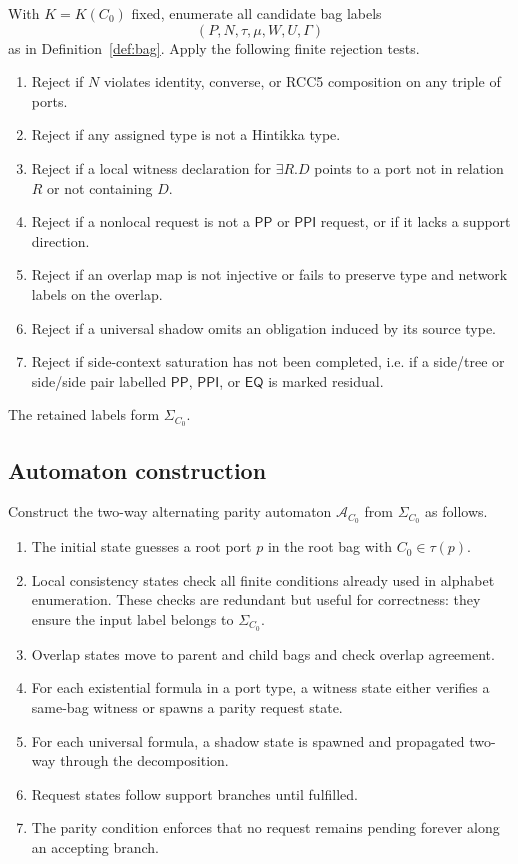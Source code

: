 \documentclass[11pt]{article}
\newcommand{\EQ}{\mathsf{EQ}}
\newcommand{\PP}{\mathsf{PP}}
\newcommand{\PPI}{\mathsf{PPI}}
\newcommand{\APTA}{\mathcal A}
\begin{document}
With $K=K(C_0)$ fixed, enumerate all candidate bag labels
\[
(P,N,\tau,\mu,W,U,\Gamma)
\]
as in Definition~\ref{def:bag}.  Apply the following finite rejection tests.
\begin{enumerate}[label=(A\arabic*)]
\item Reject if $N$ violates identity, converse, or RCC5 composition on any triple of ports.
\item Reject if any assigned type is not a Hintikka type.
\item Reject if a local witness declaration for $\exists R.D$ points to a port not in relation $R$ or not containing $D$.
\item Reject if a nonlocal request is not a $\PP$ or $\PPI$ request, or if it lacks a support direction.
\item Reject if an overlap map is not injective or fails to preserve type and network labels on the overlap.
\item Reject if a universal shadow omits an obligation induced by its source type.
\item Reject if side-context saturation has not been completed, i.e. if a side/tree or side/side pair labelled $\PP$, $\PPI$, or $\EQ$ is marked residual.
\end{enumerate}
The retained labels form $\Sigma_{C_0}$.

\subsection{Automaton construction}

Construct the two-way alternating parity automaton $\APTA_{C_0}$ from $\Sigma_{C_0}$ as follows.

\begin{enumerate}[label=(D\arabic*)]
\item The initial state guesses a root port $p$ in the root bag with $C_0\in\tau(p)$.
\item Local consistency states check all finite conditions already used in alphabet enumeration.  These checks are redundant but useful for correctness: they ensure the input label belongs to $\Sigma_{C_0}$.
\item Overlap states move to parent and child bags and check overlap agreement.
\item For each existential formula in a port type, a witness state either verifies a same-bag witness or spawns a parity request state.
\item For each universal formula, a shadow state is spawned and propagated two-way through the decomposition.
\item Request states follow support branches until fulfilled.
\item The parity condition enforces that no request remains pending forever along an accepting branch.
\end{enumerate}
\end{document}

